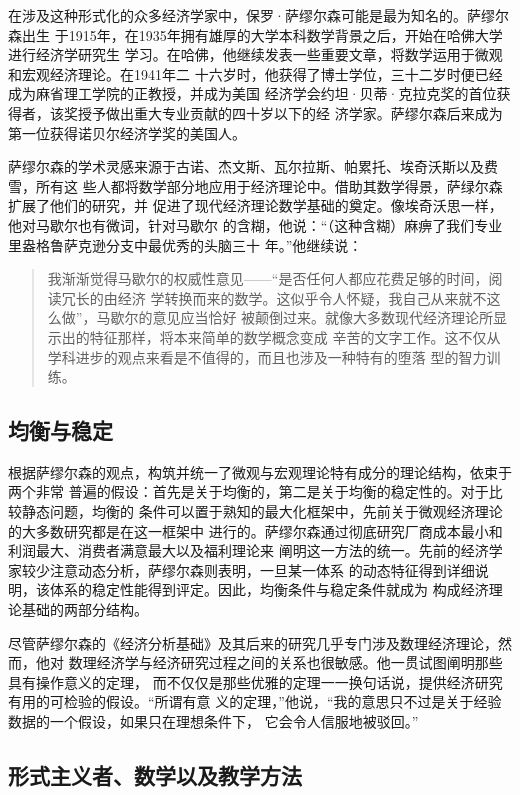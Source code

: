在涉及这种形式化的众多经济学家中，保罗·萨缪尔森可能是最为知名的。萨缪尔森出生
于1915年，在1935年拥有雄厚的大学本科数学背景之后，开始在哈佛大学进行经济学研究生
学习。在哈佛，他继续发表一些重要文章，将数学运用于微观和宏观经济理论。在1941年二
十六岁时，他获得了博士学位，三十二岁时便已经成为麻省理工学院的正教授，并成为美国
经济学会约坦·贝蒂·克拉克奖的首位获得者，该奖授予做出重大专业贡献的四十岁以下的经
济学家。萨缪尔森后来成为第一位获得诺贝尔经济学奖的美国人。

萨缪尔森的学术灵感来源于古诺、杰文斯、瓦尔拉斯、帕累托、埃奇沃斯以及费雪，所有这
些人都将数学部分地应用于经济理论中。借助其数学得景，萨绿尔森扩展了他们的研究，并
促进了现代经济理论数学基础的奠定。像埃奇沃思一样，他对马歇尔也有微词，针对马歇尔
的含糊，他说：“（这种含糊）麻痹了我们专业里盎格鲁萨克逊分支中最优秀的头脑三十
年。”他继续说：
\begin{quotation}
  我渐渐觉得马歇尔的权威性意见——“是否任何人都应花费足够的时间，阅读冗长的由经济
  学转换而来的数学。这似乎令人怀疑，我自己从来就不这么做”，马歇尔的意见应当恰好
  被颠倒过来。就像大多数现代经济理论所显示出的特征那样，将本来简单的数学概念变成
  辛苦的文字工作。这不仅从学科进步的观点来看是不值得的，而且也涉及一种特有的堕落
  型的智力训练。
\end{quotation}

\subsection{均衡与稳定}

根据萨缪尔森的观点，构筑并统一了微观与宏观理论特有成分的理论结构，依束于两个非常
普遍的假设：首先是关于均衡的，第二是关于均衡的稳定性的。对于比较静态问题，均衡的
条件可以置于熟知的最大化框架中，先前关于微观经济理论的大多数研究都是在这一框架中
进行的。萨缪尔森通过彻底研究厂商成本最小和利润最大、消费者满意最大以及福利理论来
阐明这一方法的统一。先前的经济学家较少注意动态分析，萨缪尔森则表明，一旦某一体系
的动态特征得到详细说明，该体系的稳定性能得到评定。因此，均衡条件与稳定条件就成为
构成经济理论基础的两部分结构。

尽管萨缪尔森的《经济分析基础》及其后来的研究几乎专门涉及数理经济理论，然而，他对
数理经济学与经济研究过程之间的关系也很敏感。他一贯试图阐明那些具有操作意义的定理，
而不仅仅是那些优雅的定理一一换句话说，提供经济研究有用的可检验的假设。“所谓有意
义的定理，”他说，“我的意思只不过是关于经验数据的一个假设，如果只在理想条件下，
它会令人信服地被驳回。”

\subsection{形式主义者、数学以及教学方法}

